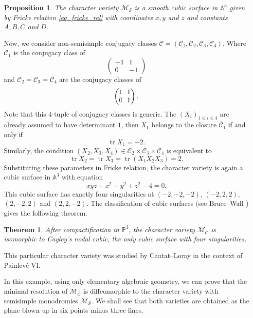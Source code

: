 \documentclass[JEP,XML,SOM,NoEqCountersInSection,Unicode,published]{cedram}
\theoremstyle{definition}
\theoremstyle{plain}
\newtheorem{theorem}[definition]{Theorem}
\newtheorem{proposition}[definition]{Proposition}
\DeclareMathOperator{\tr}{tr}
\begin{document}
\begin{proposition}
The character variety $\mathcal{M}_{\boldsymbol{\mathcal{S}}}$ is a smooth cubic surface in $\mathbb{A}^3$ given by Fricke relation \eqref{eq_fricke_rel} with coordinates $x,y$ and $z$ and constants $A, B, C$ and $D$.
\end{proposition}

Now, we consider non-semisimple conjugacy classes $\boldsymbol{\mathcal{C}}=\left(\mathcal{C}_1,\mathcal{C}_2,\mathcal{C}_3,\mathcal{C}_4\right)$. Where $\mathcal{C}_1$ is the conjugacy class of
\[
\begin{pmatrix}
-1 & 1 \\
0 & -1
\end{pmatrix}
\]
and $\mathcal{C}_2=\mathcal{C}_3 = \mathcal{C}_4$ are the conjugacy classes of
\[\arraycolsep3.5pt
\begin{pmatrix}
1 & 1 \\
0 & 1
\end{pmatrix}.
\]
Note that this $4$-tuple of conjugacy classes is generic. The $(X_i)_{1\le i \le 4}$ are already assumed to have determinant $1$, then $X_1$ belongs to the closure $\overline{\mathcal{C}}_1$ if and only if
\[
\tr X_1 = -2.
\]
Similarly, the condition $(X_2, X_3, X_4)\in \overline{\mathcal{C}}_2\times \overline{\mathcal{C}}_3 \times
\overline{\mathcal{C}}_4$ is equivalent to
\[
\tr X_2 = \tr X_3 = \tr (X_1 X_2 X_3)= 2.
\]
Substituting these parameters in Fricke relation, the character variety is again a cubic surface in $\mathbb{A}^3$ with equation
\begin{equation}\label{eq_cayley_char}
x y z + x^2 +y^2 +z^2 - 4 =0.
\end{equation}
This cubic surface has exactly four singularities at $(-2,-2,-2)$, $(-2,2,2)$, $(2,-2,2)$ and $(2,2,-2)$.
The classification of cubic surfaces (see Bruce--Wall \cite{Bruce_cubic}) gives the following theorem.
\begin{theorem}\label{th_compactification_cayley}
After compactification in $\mathbb{P}^3$, the character variety $\mathcal{M}_{\overline{\boldsymbol{\mathcal{C}}}}$ is isomorphic to Cayley's nodal cubic, the only cubic surface with four singularities.
\end{theorem}
This particular character variety was studied by Cantat--Loray \cite{Cantat_Loray} in the context of Painlevé VI.

In this example, using only elementary algebraic geometry, we can prove that the minimal resolution of $\mathcal{M}_{\overline{\boldsymbol{\mathcal{C}}}}$ is diffeomorphic to the character variety with semisimple monodromies $\mathcal{M}_{\boldsymbol{\mathcal{S}}}$. We shall see that both varieties are obtained as the plane blown-up in six points minus three lines.
\end{document}
